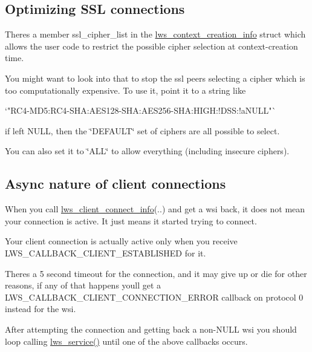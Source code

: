 \subsection*{Optimizing S\+SL connections }

There\textquotesingle{}s a member {\ttfamily ssl\+\_\+cipher\+\_\+list} in the {\ttfamily \hyperlink{structlws__context__creation__info}{lws\+\_\+context\+\_\+creation\+\_\+info}} struct which allows the user code to restrict the possible cipher selection at context-\/creation time.

You might want to look into that to stop the ssl peers selecting a cipher which is too computationally expensive. To use it, point it to a string like \begin{DoxyVerb}    `"RC4-MD5:RC4-SHA:AES128-SHA:AES256-SHA:HIGH:!DSS:!aNULL"`
\end{DoxyVerb}


if left {\ttfamily N\+U\+LL}, then the \char`\"{}\+D\+E\+F\+A\+U\+L\+T\char`\"{} set of ciphers are all possible to select.

You can also set it to {\ttfamily \char`\"{}\+A\+L\+L\char`\"{}} to allow everything (including insecure ciphers).

\subsection*{Async nature of client connections }

When you call {\ttfamily \hyperlink{structlws__client__connect__info}{lws\+\_\+client\+\_\+connect\+\_\+info}(..)} and get a {\ttfamily wsi} back, it does not mean your connection is active. It just means it started trying to connect.

Your client connection is actually active only when you receive {\ttfamily L\+W\+S\+\_\+\+C\+A\+L\+L\+B\+A\+C\+K\+\_\+\+C\+L\+I\+E\+N\+T\+\_\+\+E\+S\+T\+A\+B\+L\+I\+S\+H\+ED} for it.

There\textquotesingle{}s a 5 second timeout for the connection, and it may give up or die for other reasons, if any of that happens you\textquotesingle{}ll get a {\ttfamily L\+W\+S\+\_\+\+C\+A\+L\+L\+B\+A\+C\+K\+\_\+\+C\+L\+I\+E\+N\+T\+\_\+\+C\+O\+N\+N\+E\+C\+T\+I\+O\+N\+\_\+\+E\+R\+R\+OR} callback on protocol 0 instead for the {\ttfamily wsi}.

After attempting the connection and getting back a non-\/{\ttfamily N\+U\+LL} {\ttfamily wsi} you should loop calling {\ttfamily \hyperlink{group__service_gaf95bd0c663d6516a0c80047d9b1167a8}{lws\+\_\+service()}} until one of the above callbacks occurs.

